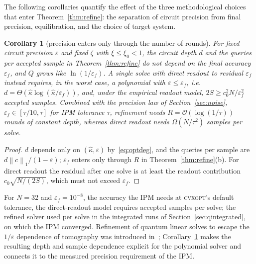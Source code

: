 \documentclass[11pt]{article}
\newtheorem{corollary}[theorem]{Corollary}
\theoremstyle{definition}
\newcommand{\norm}[1]{\left\lVert #1 \right\rVert}
\newcommand{\kh}{\hat\kappa}
\newcommand{\eps}{\varepsilon}
\newcommand{\bigO}{\mathcal{O}}
\begin{document}
The following corollaries quantify the effect of the three methodological choices that enter Theorem~\ref{thm:refine}: the separation of circuit precision from final precision, equilibration, and the choice of target system.

\begin{corollary}[precision enters only through the number of rounds]\label{cor:precision}
For fixed circuit precision $\eps$ and fixed $\zeta$ with $\xi\le\xi_0<1$, the circuit depth $d$ and the queries per accepted sample in Theorem~\ref{thm:refine} do not depend on the final accuracy $\eps_f$, and $Q$ grows like $\ln(1/\eps_f)$. A single solve with direct readout to residual $\eps_f$ instead requires, in the worst case, a polynomial with $\eps\le\eps_f$, i.e.\ $d=\Theta(\kh\log(\kh/\eps_f))$, and, under the empirical readout model, $2S\ge c_0^2N/\eps_f^2$ accepted samples. Combined with the precision law of Section~\ref{sec:noise}, $\eps_f\in[\tau/10,\tau]$ for IPM tolerance $\tau$, refinement needs $R=\bigO(\log(1/\tau))$ rounds of constant depth, whereas direct readout needs $\Omega(N/\tau^{2})$ samples per solve.
\end{corollary}
\begin{proof}
$d$ depends only on $(\kh,\eps)$ by~\eqref{eq:optdeg}, and the queries per sample are $d\norm{c}_1/(1-\eps)$; $\eps_f$ enters only through $R$ in Theorem~\ref{thm:refine}(b). For direct readout the residual after one solve is at least the readout contribution $c_0\sqrt{N/(2S)}$, which must not exceed $\eps_f$.
\end{proof}
For $N=32$ and $\eps_f=10^{-8}$, the accuracy the IPM needs at \textsc{cvxopt}'s default tolerance, the direct-readout model requires \directSamples{} accepted samples per solve; the refined solver used  per solve in the integrated runs of Section~\ref{sec:qintegrated}, on which the IPM converged. Refinement of quantum linear solves to escape the $1/\eps$ dependence of tomography was introduced in~\cite{mohammadisiahroudi2024efficient,harkness2026ir}; Corollary~\ref{cor:precision} makes the resulting depth and sample dependence explicit for the polynomial solver and connects it to the measured precision requirement of the IPM.
\end{document}
